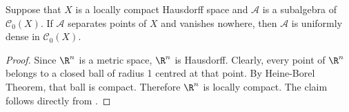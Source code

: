 \begin{corollary}
\label{thm:cor:stone-weierstrass:lchrn}
Suppose that $X$ is a locally compact Hausdorff space and $\mathcal{A}$ is a subalgebra of $\mathcal{C}_0(X)$. If $\mathcal{A}$ separates points of $X$ and vanishes nowhere, then $\mathcal{A}$ is uniformly dense in $\mathcal{C}_0(X)$.
\end{corollary}
\begin{proof} Since $\R^n$ is a metric space, $\R^n$ is Hausdorff. Clearly, every point of $\R^n$ belongs to a closed ball of radius 1 centred at that point. By Heine-Borel Theorem, that ball is compact. Therefore $\R^n$ is locally compact. The claim follows directly from .
\end{proof}